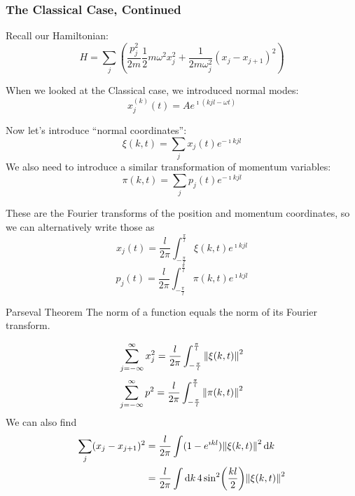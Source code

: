 \documentclass[a4paper,twoside,master.tex]{subfiles}
\begin{document}

\subsubsection{The Classical Case, Continued}

Recall our Hamiltonian:
\begin{equation}
    H = \sum_j \left( \frac{ p^2_j}{2m} \frac{1}{2} m \omega^2 x_j^2 + \frac{1}{2 m \omega^2_j} (x_j - x_{j+1})^2 \right)
\end{equation}

When we looked at the Classical case, we introduced normal modes:
\begin{equation}
    x_j^{(k)}(t) = A e^{\imath (kj l - \omega t)}
\end{equation}

Now let's introduce ``normal coordinates'':
\begin{equation}
\xi(k, t) = \sum_j x_j(t) e^{- \imath kj l}
\end{equation}
We also need to introduce a similar transformation of momentum variables:
\begin{equation}
    \pi(k, t) = \sum_j p_j(t) e^{- \imath kj l}
\end{equation}

These are the Fourier transforms of the position and momentum coordinates, so we can alternatively write those as
\begin{equation}
    x_j(t) = \frac{l}{2 \pi} \int_{- \frac{\pi}{l}}^{ \frac{\pi}{l}} \xi(k, t) e^{\imath kj l}
\end{equation}
\begin{equation}
    p_j(t) = \frac{l}{2 \pi} \int_{- \frac{\pi}{l}}^{ \frac{\pi}{l}} \pi(k, t) e^{\imath kj l}
\end{equation}

\begin{theorem}{Parseval Theorem}
    The norm of a function equals the norm of its Fourier transform.
\end{theorem}
\begin{equation}
    \sum_{j=- \infty}^{\infty} x_j^2 = \frac{l}{2 \pi} \int_{- \frac{\pi}{l}}^{ \frac{\pi}{l}} \norm{\xi(k,t)}^2
\end{equation}
\begin{equation}
    \sum_{j=- \infty}^{\infty} p^2 = \frac{l}{2 \pi} \int_{- \frac{\pi}{l}}^{ \frac{\pi}{l}} \norm{\pi(k,t)}^2
\end{equation}
We can also find
\begin{align}
    \sum_j (x_j - x_{j+1})^2 &= \frac{l}{2 \pi} \int (1 - e^{\imath k l}) \norm{\xi(k,t)}^2 \dd{k} \\
    &= \frac{l}{2 \pi} \int \dd{k} 4 \sin[2](\frac{kl}{2}) \norm{ \xi(k,t)}^2
\end{align}
\end{document}
